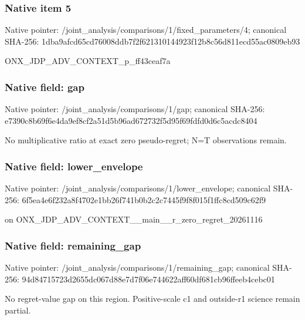 \documentclass[10pt,a4paper]{article}
\begin{document}
\subsubsection{Native item 5}
Native pointer: /joint\_\allowbreak{}analysis/comparisons/1/fixed\_\allowbreak{}parameters/4; canonical SHA-256: 1dba9afcd65cd76008ddb7f2f621310144923f12b8c56d811ecd55ac0809eb93

\begingroup\raggedright\sloppy ONX\_\allowbreak{}JDP\_\allowbreak{}ADV\_\allowbreak{}CONTEXT\_\allowbreak{}p\_\allowbreak{}ff43ceaf7a\par\endgroup

\subsubsection{Native field: gap}
Native pointer: /joint\_\allowbreak{}analysis/comparisons/1/gap; canonical SHA-256: e7390c8b69f6e4da9ef8cf2a51d5b96ad672732f5d95f69fdfd0d6c5acdc8404

\begingroup\raggedright\sloppy No multiplicative ratio at exact zero pseudo-regret;\allowbreak{} N=\allowbreak{}T observations remain.\par\endgroup

\subsubsection{Native field: lower\_\allowbreak{}envelope}
Native pointer: /joint\_\allowbreak{}analysis/comparisons/1/lower\_\allowbreak{}envelope; canonical SHA-256: 6f5ea4e6f232a8f4702e1bb26f741b0b2c2c7445f9f8f015f1ffc8cd509c62f9

\begingroup\raggedright{} on ONX\_\allowbreak{}JDP\_\allowbreak{}ADV\_\allowbreak{}CONTEXT\_\allowbreak{}\_\allowbreak{}main\_\allowbreak{}\_\allowbreak{}r\_\allowbreak{}zero\_\allowbreak{}regret\_\allowbreak{}20261116\par\endgroup

\subsubsection{Native field: remaining\_\allowbreak{}gap}
Native pointer: /joint\_\allowbreak{}analysis/comparisons/1/remaining\_\allowbreak{}gap; canonical SHA-256: 94d84715723d2655dc067d88e7d7f06e744622aff60df681cb96ffeeb4cebc01

\begingroup\raggedright\sloppy No regret-value gap on this region. Positive-scale c1 and outside-r1 science remain partial.\par\endgroup
\end{document}
